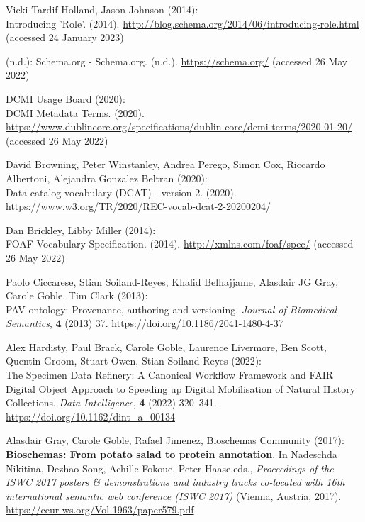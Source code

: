 \begin{thebibliography}{9}
Vicki Tardif Holland, Jason Johnson (2014): \\
Introducing '{Role}'.
(2014). \url{http://blog.schema.org/2014/06/introducing-role.html}
(accessed 24 January 2023)

(n.d.): Schema.org - {Schema}.org. (n.d.). \url{https://schema.org/}
(accessed 26 May 2022)

DCMI Usage Board (2020): \\
{DCMI Metadata Terms}. (2020).
\url{https://www.dublincore.org/specifications/dublin-core/dcmi-terms/2020-01-20/}
(accessed 26 May 2022)

David Browning, Peter Winstanley, Andrea Perego, Simon Cox, Riccardo
Albertoni, Alejandra Gonzalez Beltran (2020): \\
Data catalog vocabulary
({DCAT}) - version 2. (2020).
\url{https://www.w3.org/TR/2020/REC-vocab-dcat-2-20200204/}

Dan Brickley, Libby Miller (2014): \\
{FOAF Vocabulary Specification}.
(2014). \url{http://xmlns.com/foaf/spec/} (accessed 26 May 2022)

Paolo Ciccarese, Stian Soiland-Reyes, Khalid Belhajjame, Alasdair JG
Gray, Carole Goble, Tim Clark (2013): \\
{PAV} ontology: Provenance,
authoring and versioning. \emph{Journal of Biomedical Semantics},
\textbf{4} (2013) 37.
\url{https://doi.org/10.1186/2041-1480-4-37}

Alex Hardisty, Paul Brack, Carole Goble, Laurence Livermore, Ben Scott,
Quentin Groom, Stuart Owen, Stian Soiland-Reyes (2022): \\
The {Specimen
Data Refinery}: {A Canonical Workflow Framework} and {FAIR} {Digital
Object Approach} to {Speeding} up {Digital Mobilisation} of {Natural
History} {Collections}. \emph{Data Intelligence}, \textbf{4} (2022)
320--341.
\url{https://doi.org/10.1162/dint_a_00134}

Alasdair Gray, Carole Goble, Rafael Jimenez, Bioschemas Community
(2017): \\
\textbf{Bioschemas: From potato salad to protein annotation}. In
Nadeschda Nikitina, Dezhao Song, Achille Fokoue, Peter Haase,eds.,
\emph{Proceedings of the ISWC 2017 posters \& demonstrations and
industry tracks co-located with 16th international semantic web
conference (ISWC 2017)} (Vienna, Austria, 2017).
\url{https://ceur-ws.org/Vol-1963/paper579.pdf}


\end{thebibliography}

